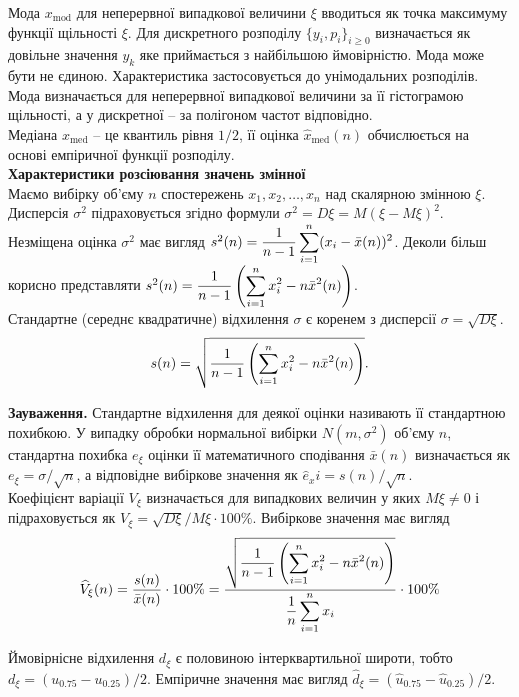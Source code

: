 Мода $x_{\text{mod}}$ для неперервної випадкової величини $\xi$ вводиться як точка максимуму функції щільності $\xi$. Для дискретного розподілу $\{ y_i, p_i \}_{i \ge 0}$ визначається як довільне значення $y_k$ яке приймається з найбільшою ймовірністю. Мода може бути не єдиною. Характеристика застосовується до унімодальних розподілів. Мода визначається для неперервної випадкової величини за її гістограмою щільності, а у дискретної -- за полігоном частот відповідно.\\

Медіана $x_{\text{med}}$ -- це квантиль рівня $1/2$, її оцінка $\widehat{x}_{\text{med}}(n)$ обчислюється на основі емпіричної функції розподілу. \\ 

\textbf{Характеристики розсіювання значень змінної} \\

Маємо вибірку об'єму $n$ спостережень $x_1, x_2, \ldots, x_n$ над скалярною змінною $\xi$. \\

Дисперсія $\sigma^2$ підраховується згідно формули $\sigma^2 = D\xi = M(\xi - M \xi)^2$. Незміщена оцінка $\sigma^2$ має вигляд $s^2(n) = \dfrac{1}{n-1} \displaystyle\sum\limits_{i=1}^n (x_i - \bar{x}(n))^2$. Деколи більш корисно представляти $s^2(n) = \dfrac{1}{n-1} \left(\displaystyle\sum\limits_{i=1}^n x_i^2 - n \bar{x}^2(n)\right)$. \\

Стандартне (середнє квадратичне) відхилення $\sigma$ є коренем з дисперсії $\sigma = \sqrt{D \xi}$. \[ s(n) = \sqrt{\dfrac{1}{n-1} \left(\displaystyle\sum\limits_{i=1}^n x_i^2 - n \bar{x}^2(n)\right)}. \]

\textbf{Зауваження.} Стандартне відхилення для деякої оцінки називають її стандартною похибкою. У випадку обробки нормальної вибірки $N(m, \sigma^2)$ об'єму $n$, стандартна похибка $e_\xi$ оцінки її математичного сподівання $\bar{x}(n)$ визначається як $e_\xi = \sigma / \sqrt{n}$, а відповідне вибіркове значення як $\widehat{e}_xi = s(n) / \sqrt{n}$. \\

Коефіцієнт варіації $V_\xi$ визначається для випадкових величин у яких $M \xi \ne 0$ і підраховується як $V_\xi = \sqrt{D\xi} / M \xi \cdot 100\%$. Вибіркове значення має вигляд 
\[ \widehat{V}_\xi(n) = \dfrac{s(n)}{\bar{x}(n)} \cdot 100\% = \dfrac{\sqrt{\dfrac{1}{n-1} \left(\displaystyle\sum\limits_{i=1}^n x_i^2 - n \bar{x}^2(n)\right)}}{\dfrac{1}{n} \displaystyle\sum\limits_{i=1}^n x_i} \cdot 100\% \]

Ймовірнісне відхилення $d_\xi$ є половиною інтерквартильної широти, тобто $d_\xi = (u_{0.75} - u_{0.25}) / 2$. Емпіричне значення має вигляд $\widehat{d}_\xi = (\widehat{u}_{0.75} - \widehat{u}_{0.25}) / 2$. \\

